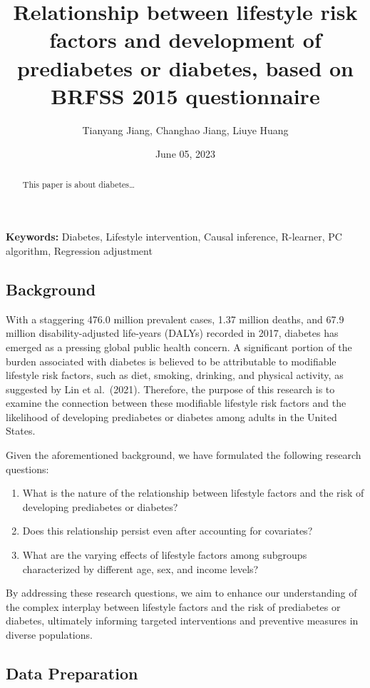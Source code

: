 \documentclass[
  12pt,
]{article}
\title{Relationship between lifestyle risk factors and development of
prediabetes or diabetes, based on BRFSS 2015 questionnaire}
\author{Tianyang Jiang, Changhao Jiang, Liuye Huang}
\date{June 05, 2023}
\begin{document}
\maketitle
\begin{abstract}
This paper is about diabetes\ldots{}
\end{abstract}

\textbf{Keywords:} Diabetes, Lifestyle intervention, Causal inference,
R-learner, PC algorithm, Regression adjustment

\hypertarget{background}{%
\subsection{Background}\label{background}}

With a staggering 476.0 million prevalent cases, 1.37 million deaths,
and 67.9 million disability-adjusted life-years (DALYs) recorded in
2017, diabetes has emerged as a pressing global public health concern. A
significant portion of the burden associated with diabetes is believed
to be attributable to modifiable lifestyle risk factors, such as diet,
smoking, drinking, and physical activity, as suggested by Lin et
al.~(2021). Therefore, the purpose of this research is to examine the
connection between these modifiable lifestyle risk factors and the
likelihood of developing prediabetes or diabetes among adults in the
United States.

Given the aforementioned background, we have formulated the following
research questions:

\begin{enumerate}
\def\labelenumi{\arabic{enumi}.}
\item
  What is the nature of the relationship between lifestyle factors and
  the risk of developing prediabetes or diabetes?
\item
  Does this relationship persist even after accounting for covariates?
\item
  What are the varying effects of lifestyle factors among subgroups
  characterized by different age, sex, and income levels?
\end{enumerate}

By addressing these research questions, we aim to enhance our
understanding of the complex interplay between lifestyle factors and the
risk of prediabetes or diabetes, ultimately informing targeted
interventions and preventive measures in diverse populations.

\hypertarget{data-preparation}{%
\subsection{Data Preparation}\label{data-preparation}}
\end{document}
